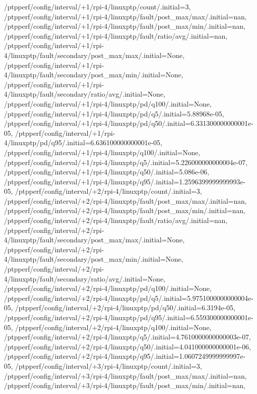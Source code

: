 {    /ptpperf/config/interval/+1/rpi-4/linuxptp/count/.initial=3,
    /ptpperf/config/interval/+1/rpi-4/linuxptp/fault/post_max/max/.initial=nan,
    /ptpperf/config/interval/+1/rpi-4/linuxptp/fault/post_max/min/.initial=nan,
    /ptpperf/config/interval/+1/rpi-4/linuxptp/fault/ratio/avg/.initial=nan,
    /ptpperf/config/interval/+1/rpi-4/linuxptp/fault/secondary/post_max/max/.initial=None,
    /ptpperf/config/interval/+1/rpi-4/linuxptp/fault/secondary/post_max/min/.initial=None,
    /ptpperf/config/interval/+1/rpi-4/linuxptp/fault/secondary/ratio/avg/.initial=None,
    /ptpperf/config/interval/+1/rpi-4/linuxptp/pd/q100/.initial=None,
    /ptpperf/config/interval/+1/rpi-4/linuxptp/pd/q5/.initial=5.88968e-05,
    /ptpperf/config/interval/+1/rpi-4/linuxptp/pd/q50/.initial=6.331300000000001e-05,
    /ptpperf/config/interval/+1/rpi-4/linuxptp/pd/q95/.initial=6.636100000000001e-05,
    /ptpperf/config/interval/+1/rpi-4/linuxptp/q100/.initial=None,
    /ptpperf/config/interval/+1/rpi-4/linuxptp/q5/.initial=5.226000000000004e-07,
    /ptpperf/config/interval/+1/rpi-4/linuxptp/q50/.initial=5.086e-06,
    /ptpperf/config/interval/+1/rpi-4/linuxptp/q95/.initial=1.2596399999999993e-05,
    /ptpperf/config/interval/+2/rpi-4/linuxptp/count/.initial=3,
    /ptpperf/config/interval/+2/rpi-4/linuxptp/fault/post_max/max/.initial=nan,
    /ptpperf/config/interval/+2/rpi-4/linuxptp/fault/post_max/min/.initial=nan,
    /ptpperf/config/interval/+2/rpi-4/linuxptp/fault/ratio/avg/.initial=nan,
    /ptpperf/config/interval/+2/rpi-4/linuxptp/fault/secondary/post_max/max/.initial=None,
    /ptpperf/config/interval/+2/rpi-4/linuxptp/fault/secondary/post_max/min/.initial=None,
    /ptpperf/config/interval/+2/rpi-4/linuxptp/fault/secondary/ratio/avg/.initial=None,
    /ptpperf/config/interval/+2/rpi-4/linuxptp/pd/q100/.initial=None,
    /ptpperf/config/interval/+2/rpi-4/linuxptp/pd/q5/.initial=5.9751000000000004e-05,
    /ptpperf/config/interval/+2/rpi-4/linuxptp/pd/q50/.initial=6.3194e-05,
    /ptpperf/config/interval/+2/rpi-4/linuxptp/pd/q95/.initial=6.559300000000001e-05,
    /ptpperf/config/interval/+2/rpi-4/linuxptp/q100/.initial=None,
    /ptpperf/config/interval/+2/rpi-4/linuxptp/q5/.initial=4.7610000000000003e-07,
    /ptpperf/config/interval/+2/rpi-4/linuxptp/q50/.initial=4.041000000000001e-06,
    /ptpperf/config/interval/+2/rpi-4/linuxptp/q95/.initial=1.0607249999999997e-05,
    /ptpperf/config/interval/+3/rpi-4/linuxptp/count/.initial=3,
    /ptpperf/config/interval/+3/rpi-4/linuxptp/fault/post_max/max/.initial=nan,
    /ptpperf/config/interval/+3/rpi-4/linuxptp/fault/post_max/min/.initial=nan,
}
